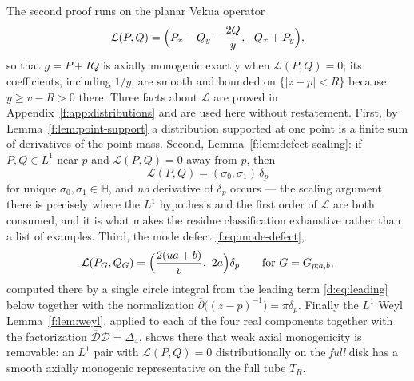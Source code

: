 \documentclass[11pt,a4paper]{article}
\numberwithin{equation}{section}
\theoremstyle{definition}
\theoremstyle{remark}
\theoremstyle{plain}
\newcommand{\HH}{\mathbb H}
\newcommand{\Dop}{\mathcal D}
\newcommand{\lap}{\Delta_4}
\newcommand{\Tube}{T}
\newcommand{\abs}[1]{\lvert #1\rvert}
\begin{document}
The second proof runs on the planar Vekua operator
\begin{equation}
 \mathcal L(P,Q)=\Bigl(P_x-Q_y-\frac{2Q}{y},\ \ Q_x+P_y\Bigr),
 \label{d:eq:Lop}
\end{equation}
so that $g=P+IQ$ is axially monogenic exactly when $\mathcal L(P,Q)=0$; its
coefficients, including $1/y$, are smooth and bounded on
$\{\abs{z-p}<R\}$ because $y\ge v-R>0$ there.  Three facts about
$\mathcal L$ are proved in Appendix~\ref{f:app:distributions} and are used
here without restatement.  First, by Lemma~\ref{f:lem:point-support} a
distribution supported at one point is a finite sum of derivatives of the
point mass.  Second, Lemma~\ref{f:lem:defect-scaling}: if $P,Q\in L^1$ near
$p$ and $\mathcal L(P,Q)=0$ away from $p$, then
\begin{equation}
 \mathcal L(P,Q)=(\sigma_0,\sigma_1)\,\delta_p
 \label{d:eq:defect}
\end{equation}
for unique $\sigma_0,\sigma_1\in\HH$, and \emph{no} derivative of
$\delta_p$ occurs --- the scaling argument there is precisely where the
$L^1$ hypothesis and the first order of $\mathcal L$ are both consumed, and
it is what makes the residue classification exhaustive rather than a list
of examples.  Third, the mode defect \eqref{f:eq:mode-defect},
\begin{equation}
 \mathcal L(P_G,Q_G)=\Bigl(\frac{2(ua+b)}{v},\ 2a\Bigr)\delta_p
 \qquad\text{for }G=G_{p;a,b},
 \label{d:eq:mode-defect}
\end{equation}
computed there by a single circle integral from the leading term
\eqref{d:eq:leading} below together with the normalization
$\bar\partial\bigl((z-p)^{-1}\bigr)=\pi\delta_p$.  Finally the $L^1$ Weyl
Lemma~\ref{f:lem:weyl}, applied to each of the four real components
together with the factorization $\overline{\Dop}\Dop=\lap$, shows there
that weak axial monogenicity is removable: an $L^1$ pair with
$\mathcal L(P,Q)=0$ distributionally on the \emph{full} disk has a smooth
axially monogenic representative on the full tube $\Tube_R$.
\end{document}
